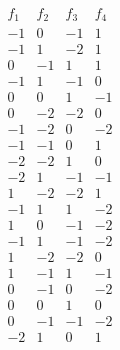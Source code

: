 $$\begin{array}{rrrr} 
f_1 & f_2 & f_3 & f_4 \\ 
\hline 
-1 &  0 & -1 &  1 \\ 
-1 &  1 & -2 &  1 \\ 
 0 & -1 &  1 &  1 \\ 
-1 &  1 & -1 &  0 \\ 
 0 &  0 &  1 & -1 \\ 
 0 & -2 & -2 &  0 \\ 
-1 & -2 &  0 & -2 \\ 
-1 & -1 &  0 &  1 \\ 
-2 & -2 &  1 &  0 \\ 
-2 &  1 & -1 & -1 \\ 
 1 & -2 & -2 &  1 \\ 
-1 &  1 &  1 & -2 \\ 
 1 &  0 & -1 & -2 \\ 
-1 &  1 & -1 & -2 \\ 
 1 & -2 & -2 &  0 \\ 
 1 & -1 &  1 & -1 \\ 
 0 & -1 &  0 & -2 \\ 
 0 &  0 &  1 &  0 \\ 
 0 & -1 & -1 & -2 \\ 
-2 &  1 &  0 &  1 \\ 
\end{array}$$ 
